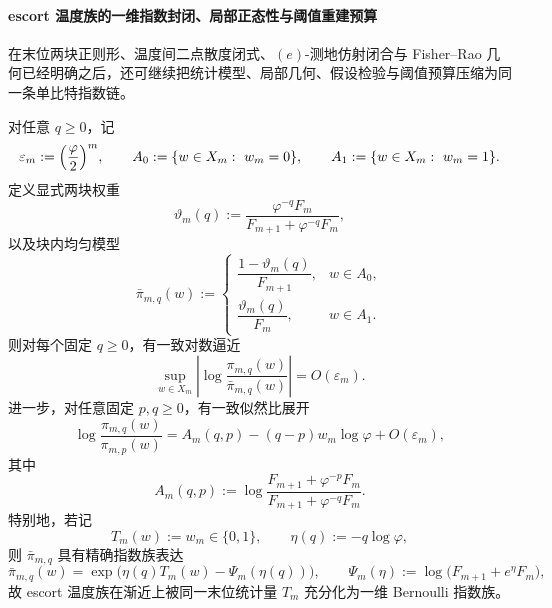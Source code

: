 \paragraph{escort 温度族的一维指数封闭、局部正态性与阈值重建预算}
在末位两块正则形、温度间二点散度闭式、\((e)\)-测地仿射闭合与 Fisher--Rao 几何已经明确之后，还可继续把统计模型、局部几何、假设检验与阈值预算压缩为同一条单比特指数链。

\begin{theorem}\label{thm:xi-time-part9ob-escort-loglik-onebit-expfamily}
对任意 \(q\ge 0\)，记
\[
\varepsilon_m:=\Bigl(\frac{\varphi}{2}\Bigr)^m,
\qquad
A_0:=\{w\in X_m:\ w_m=0\},
\qquad
A_1:=\{w\in X_m:\ w_m=1\}.
\]
定义显式两块权重
\[
\vartheta_m(q):=
\frac{\varphi^{-q}F_m}{F_{m+1}+\varphi^{-q}F_m},
\]
以及块内均匀模型
\[
\bar\pi_{m,q}(w):=
\begin{cases}
\dfrac{1-\vartheta_m(q)}{F_{m+1}},& w\in A_0,\\[8pt]
\dfrac{\vartheta_m(q)}{F_m},& w\in A_1.
\end{cases}
\]
则对每个固定 \(q\ge 0\)，有一致对数逼近
\[
\sup_{w\in X_m}\left|
\log\frac{\pi_{m,q}(w)}{\bar\pi_{m,q}(w)}
\right|
=
O(\varepsilon_m).
\]
进一步，对任意固定 \(p,q\ge 0\)，有一致似然比展开
\[
\log\frac{\pi_{m,q}(w)}{\pi_{m,p}(w)}
=
A_m(q,p)
-(q-p)w_m\log\varphi
+O(\varepsilon_m),
\]
其中
\[
A_m(q,p):=
\log\frac{F_{m+1}+\varphi^{-p}F_m}{F_{m+1}+\varphi^{-q}F_m}.
\]
特别地，若记
\[
T_m(w):=w_m\in\{0,1\},
\qquad
\eta(q):=-q\log\varphi,
\]
则 \(\bar\pi_{m,q}\) 具有精确指数族表达
\[
\bar\pi_{m,q}(w)
=
\exp\!\bigl(\eta(q)T_m(w)-\Psi_m(\eta(q))\bigr),
\qquad
\Psi_m(\eta):=\log\!\bigl(F_{m+1}+e^{\eta}F_m\bigr),
\]
故 escort 温度族在渐近上被同一末位统计量 \(T_m\) 充分化为一维 Bernoulli 指数族。
\end{theorem}

